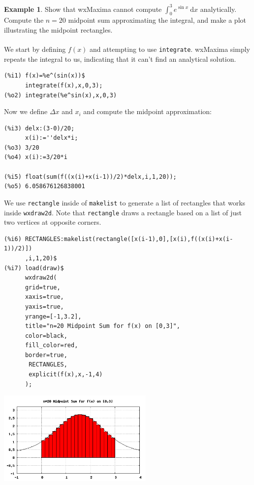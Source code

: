 \documentclass[10.5pt,twoside]{report}
\theoremstyle{definition}
\newtheorem{exmp}{Example}[section]
\begin{document}
\begin{exmp} Show that wxMaxima cannot compute $\displaystyle \int_0^3 e^{\sin{x}}\ \mathrm{d}x$ analytically.  Compute the $n=20$ midpoint sum approximating the integral, and make a plot illustrating the midpoint rectangles.\\
${}$\\

We start by defining $f(x)$ and attempting to use \verb|integrate|.  wxMaxima simply repeats the integral to us, indicating that it can't find an analytical solution.

\begin{verbatim}
(%i1) f(x)=%e^(sin(x))$
      integrate(f(x),x,0,3);
(%o2) integrate(%e^sin(x),x,0,3)
\end{verbatim}

Now we define $\Delta x$ and $x_i$ and compute the midpoint approximation:

\begin{verbatim}
(%i3) delx:(3-0)/20;
      x(i):=''delx*i;
(%o3) 3/20
(%o4) x(i):=3/20*i

(%i5) float(sum(f((x(i)+x(i-1))/2)*delx,i,1,20));
(%o5) 6.058676126838001
\end{verbatim}

We use \verb|rectangle| inside of \verb|makelist| to generate a list of rectangles that works inside \verb|wxdraw2d|.  Note that \verb|rectangle| draws a rectangle based on a list of just two vertices at opposite corners.\\

\begin{verbatim}
(%i6) RECTANGLES:makelist(rectangle([x(i-1),0],[x(i),f((x(i)+x(i-1))/2)])
      ,i,1,20)$
(%i7) load(draw)$
      wxdraw2d(
      grid=true,
      xaxis=true,
      yaxis=true,
      yrange=[-1,3.2],
      title="n=20 Midpoint Sum for f(x) on [0,3]",
      color=black,
      fill_color=red,
      border=true,
       RECTANGLES,
       explicit(f(x),x,-1,4)
      );
\end{verbatim}

\includegraphics[width=3in]{example_2_1_1_1}

\end{exmp}
\end{document}
